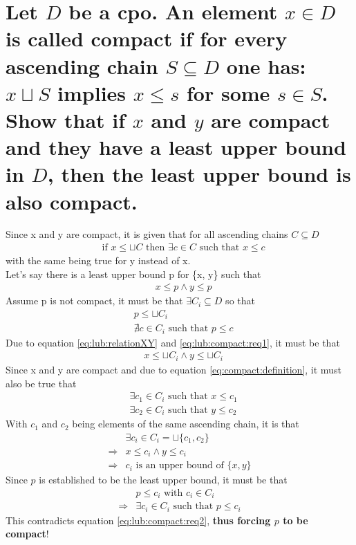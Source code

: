\section{Let $D$ be a cpo. An element $x \in D$ is called compact if for every ascending chain $S \subseteq D$ one has: $x \sqcup S$ implies $x \leq s$ for some $s \in S$. Show that if $x$ and $y$ are compact and they have a least upper bound in $D$, then the least upper bound is also compact.}

Since x and y are compact, it is given that for all ascending chains $C \subseteq D$
\begin{align}
	& \text{if } x \leq \sqcup C \text{ then } \exists c \in C \text{ such that } x \leq c \label{eq:compact:definition}
\end{align}
with the same being true for y instead of x. \\
Let's say there is a least upper bound p for \{x, y\} such that
\begin{align}
	& x \leq p \wedge y \leq p \label{eq:lub:relationXY}
\end{align}
Assume p is not compact, it must be that $\exists C_i \subseteq D$ so that
\begin{align}
	& p \leq \sqcup C_i \label{eq:lub:compact:req1} \\
	& \nexists c \in C_i \text{ such that } p \leq c \label{eq:lub:compact:req2}
\end{align}
Due to equation \ref{eq:lub:relationXY} and \ref{eq:lub:compact:req1}, it must be that
\begin{align}
	& x \leq \sqcup C_i \wedge y \leq \sqcup C_i
\end{align}
Since x and y are compact and due to equation \ref{eq:compact:definition}, it must also be true that
\begin{align}
	& \exists c_1 \in C_i \text{ such that } x \leq c_1 \\
	& \exists c_2 \in C_i \text{ such that } y \leq c_2
\end{align}
With $c_1$ and $c_2$ being elements of the same ascending chain, it is that 
\begin{align}
							& \exists c_i \in C_i = \sqcup \{c_1, c_2\} \\
	\Rightarrow & x \leq c_i \wedge y \leq c_i \\
	\Rightarrow & c_i \text{ is an upper bound of } \{x, y\}
\end{align}
Since $p$ is established to be the least upper bound, it must be that
\begin{align}
						  & p \leq c_i \text{ with } c_i \in C_i \\
	\Rightarrow & \exists c_i \in C_i \text{ such that } p \leq c_i
\end{align}
This contradicts equation \ref{eq:lub:compact:req2}, \textbf{thus forcing $p$ to be compact}!